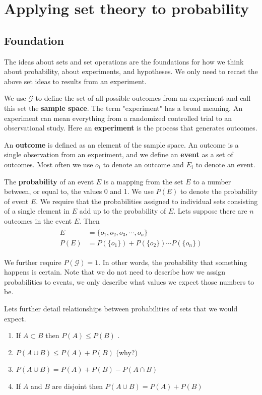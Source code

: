 \section{Applying set theory to probability}
\vspace{-0.75cm} \hspace{1mm}  
\subsection{Foundation}
The ideas about sets and set operations are the foundations for how we think about probability, about experiments, and hypotheses. 
We only need to recast the above set ideas to results from an experiment. 

We use $\mathcal{G}$ to define the set of all possible outcomes from an experiment and call this set the \textbf{sample space}. 
The term "experiment" has a broad meaning. 
An experiment can mean everything from a randomized controlled trial to an observational study.
Here an \textbf{experiment} is the process that generates outcomes.

An \textbf{outcome} is defined as an element of the sample space. 
An outcome is a single observation from an experiment, and we define an \textbf{event} as a set of outcomes. 
Most often we use $o_{i}$ to denote an outcome and $E_{i}$ to denote an event.

The \textbf{probability} of an event $E$ is a mapping from the set $E$ to a number between, or equal to, the values 0 and 1. We use $P(E)$ to denote the probability of event $E$.
We require that the probabilities assigned to individual sets consisting of a single element in $E$ add up to the probability of $E$. 
Lets suppose there are $n$ outcomes in the event $E$.
Then
\begin{align}
    \begin{aligned}
       E &= \{ o_{1}, o_{2}, o_{3}, \cdots, o_{n}\} \\ 
       P(E) &= P(\{o_{1}\}) + P(\{o_{2}\}) \cdots P(\{o_{n}\})
    \end{aligned}
\end{align}

We further require $P(\mathcal{G}) = 1$.
In other words, the probability that something happens is certain.
Note that we do not need to describe how we assign probabilities to events, we only describe what values we expect those numbers to be.

Lets further detail relationships between probabilities of sets that we would expect. 
\begin{enumerate}
    \item If $A \subset B$ then $P(A) \leq P(B)$ \label{subsetrule}. 
    \item $P(A \cup B) \leq P(A) + P(B)$ (why?)
    \item $P(A \cup B) = P(A) + P(B) - P(A \cap B)$
    \item If $A$ and $B$ are disjoint then $P(A \cup B) = P(A) + P(B) $
\end{enumerate}

